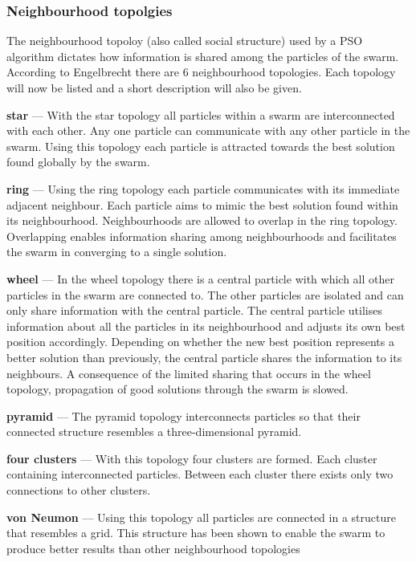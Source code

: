\subsubsection{Neighbourhood topolgies}
The neighbourhood topoloy (also called social structure) used by a PSO algorithm dictates how information is shared among the particles of the swarm. According to Engelbrecht\cite{FundamentalSwarm} there are 6 neighbourhood topologies. Each topology will now be listed and a short description will also be given.
\begin{description}
\item{\textbf{star}} --- With the star topology all particles within a swarm are interconnected with each other. Any one particle can communicate with any other particle in the swarm\cite{FundamentalSwarm}. Using this topology each particle is attracted towards the best solution found globally by the swarm\cite{FundamentalSwarm}. 
\item{\textbf{ring}} --- Using the ring topology each particle communicates with its immediate adjacent neighbour\cite{FundamentalSwarm}. Each particle aims to mimic the best solution found within its neighbourhood\cite{FundamentalSwarm}. Neighbourhoods are allowed to overlap in the ring topology\cite{FundamentalSwarm}. Overlapping enables information sharing among neighbourhoods and facilitates the swarm in converging to a single solution\cite{FundamentalSwarm}. 
\item{\textbf{wheel}} --- In the wheel topology there is a central particle with which all other particles in the swarm are connected to\cite{FundamentalSwarm}. The other particles are isolated and can only share information with the central particle\cite{FundamentalSwarm}. The central particle utilises information about all the particles in its neighbourhood and adjusts its own best position accordingly\cite{FundamentalSwarm}. Depending on whether the new best position represents a better solution than previously, the central particle shares the information to its neighbours\cite{FundamentalSwarm}. A consequence of the limited sharing that occurs in the wheel topology, propagation of good solutions through the swarm is slowed\cite{FundamentalSwarm}.
\item{\textbf{pyramid}} --- The pyramid topology interconnects particles so that their connected structure resembles a three-dimensional pyrami\cite{FundamentalSwarm}d.
\item{\textbf{four clusters}} --- With this topology four clusters are formed. Each cluster containing interconnected particles\cite{FundamentalSwarm}. Between each cluster there exists only two connections to other clusters\cite{FundamentalSwarm}.
\item{\textbf{von Neumon}} --- Using this topology all particles are connected in a structure that resembles a grid\cite{FundamentalSwarm}. This structure has been shown to enable the swarm to produce better results than other neighbourhood topologies\cite{FundamentalSwarm}
\end{description}

